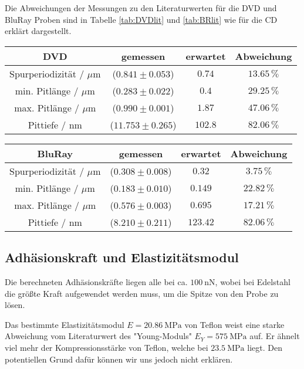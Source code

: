         Die Abweichungen der Messungen zu den Literaturwerten für die DVD und BluRay Proben sind in Tabelle \ref{tab:DVDlit} und \ref{tab:BRlit} wie für die CD erklärt dargestellt.
        \begin{center}
            \label{tab:DVDlit}
            \begin{tabular}{c c c c}
                \toprule
                DVD & gemessen & erwartet & Abweichung \\
                \midrule
                Spurperiodizität / $\mu\text{m}$   & ($0.841\pm 0.053$) & $0.74$ & $13.65\,\%$ \\
                min. Pitlänge / $\mu\text{m}$ & ($0.283\pm 0.022$) & $0.4$ & $29.25\,\%$ \\
                max. Pitlänge / $\mu\text{m}$ & ($0.990\pm 0.001$) & $1.87$ & $47.06\,\%$ \\
                Pittiefe / $\text{nm}$        & ($11.753\pm 0.265$)& $102.8$& $82.06\,\%$ \\
                \bottomrule
            \end{tabular}
        \end{center}
        \begin{center}
            \label{tab:BRlit}
            \begin{tabular}{c c c c}
                \toprule
                BluRay & gemessen & erwartet & Abweichung \\
                \midrule
                Spurperiodizität / $\mu\text{m}$   & ($0.308\pm 0.008$) & $0.32$   & $3.75\,\%$ \\
                min. Pitlänge / $\mu\text{m}$ & ($0.183\pm 0.010$) & $0.149$ & $22.82\,\%$ \\
                max. Pitlänge / $\mu\text{m}$ & ($0.576\pm 0.003$) & $0.695$ & $17.21\,\%$ \\
                Pittiefe / $\text{nm}$        & ($8.210\pm 0.211$) & $123.42$& $82.06\,\%$ \\
                \bottomrule
            \end{tabular}
        \end{center}
        \FloatBarrier
    \subsection{Adhäsionskraft und Elastizitätsmodul}
        Die berechneten Adhäsionskräfte liegen alle bei ca. $\SI{100}{\nano\newton}$, wobei bei Edelstahl die größte Kraft aufgewendet werden muss, um die Spitze von den Probe zu lösen.

        Das bestimmte Elastizitätsmodul $E = \SI{20.86}{\mega\pascal}$ von Teflon weist eine starke Abweichung vom Literaturwert des "Young-Moduls"  $E_Y = \SI{575}{\mega\pascal}$ auf. Er ähnelt viel mehr der Kompressionsstärke von Teflon, welche bei $\SI{23.5}{\mega\pascal}$ \cite{Teflon} liegt. Den potentiellen Grund dafür können wir uns jedoch nicht erklären.